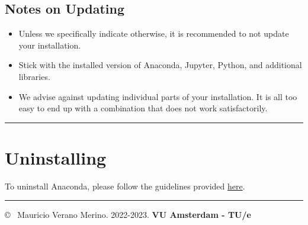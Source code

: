 \documentclass{latex-template/tufte-handout}
\begin{document}
\subsection{Notes on Updating}\label{notes-on-updating}

\begin{itemize}
	\item Unless we specifically indicate otherwise, it is recommended to not update your installation.
	\item Stick with the installed version of Anaconda, Jupyter, Python, and additional libraries.
	\item We advise against updating individual parts of your installation. It is all too easy to end up with a combination that does not work satisfactorily.
\end{itemize}

\begin{center}\rule{\linewidth}{0.5pt}\end{center}


\section{Uninstalling}\label{uninstalling}

To uninstall Anaconda, please follow the guidelines provided
\href{https://docs.anaconda.com/anaconda/install/uninstall}{here}.

    \begin{center}\rule{\linewidth}{0.5pt}\end{center}



\copyright~ Mauricio Verano Merino. 2022-2023. \textbf{VU Amsterdam - TU/e}
\end{document}
